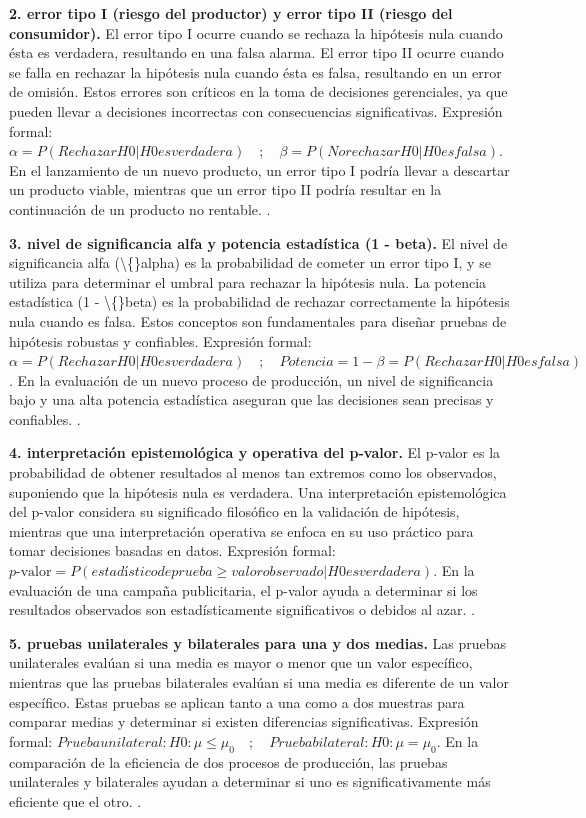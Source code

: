 {\textbf{2. error tipo I (riesgo del productor) y error tipo II (riesgo del consumidor).} El error tipo I ocurre cuando se rechaza la hipótesis nula cuando ésta es verdadera, resultando en una falsa alarma. El error tipo II ocurre cuando se falla en rechazar la hipótesis nula cuando ésta es falsa, resultando en un error de omisión. Estos errores son críticos en la toma de decisiones gerenciales, ya que pueden llevar a decisiones incorrectas con consecuencias significativas. Expresión formal: $\alpha = P(Rechazar H0 | H0 es verdadera)  \quad ; \quad \beta = P(No rechazar H0 | H0 es falsa)$. En el lanzamiento de un nuevo producto, un error tipo I podría llevar a descartar un producto viable, mientras que un error tipo II podría resultar en la continuación de un producto no rentable. \citep{anderson2012,lind2012,wackerly2010}.

\textbf{3. nivel de significancia alfa y potencia estadística (1 - beta).} El nivel de significancia alfa (\textbackslash\{\}alpha) es la probabilidad de cometer un error tipo I, y se utiliza para determinar el umbral para rechazar la hipótesis nula. La potencia estadística (1 - \textbackslash\{\}beta) es la probabilidad de rechazar correctamente la hipótesis nula cuando es falsa. Estos conceptos son fundamentales para diseñar pruebas de hipótesis robustas y confiables. Expresión formal: $\alpha = P(Rechazar H0 | H0 es verdadera)  \quad ; \quad Potencia = 1 - \beta = P(Rechazar H0 | H0 es falsa)$. En la evaluación de un nuevo proceso de producción, un nivel de significancia bajo y una alta potencia estadística aseguran que las decisiones sean precisas y confiables. \citep{anderson2012,lind2012,wackerly2010}.

\textbf{4. interpretación epistemológica y operativa del p-valor.} El p-valor es la probabilidad de obtener resultados al menos tan extremos como los observados, suponiendo que la hipótesis nula es verdadera. Una interpretación epistemológica del p-valor considera su significado filosófico en la validación de hipótesis, mientras que una interpretación operativa se enfoca en su uso práctico para tomar decisiones basadas en datos. Expresión formal: $p\text{-valor} = P(estadístico de prueba \geq valor observado | H0 es verdadera)$. En la evaluación de una campaña publicitaria, el p-valor ayuda a determinar si los resultados observados son estadísticamente significativos o debidos al azar. \citep{anderson2012,lind2012,wackerly2010}.

\textbf{5. pruebas unilaterales y bilaterales para una y dos medias.} Las pruebas unilaterales evalúan si una media es mayor o menor que un valor específico, mientras que las pruebas bilaterales evalúan si una media es diferente de un valor específico. Estas pruebas se aplican tanto a una como a dos muestras para comparar medias y determinar si existen diferencias significativas. Expresión formal: $Prueba unilateral: H0: \mu \leq \mu_0  \quad ; \quad Prueba bilateral: H0: \mu = \mu_0$. En la comparación de la eficiencia de dos procesos de producción, las pruebas unilaterales y bilaterales ayudan a determinar si uno es significativamente más eficiente que el otro. \citep{anderson2012,lind2012,wackerly2010}.

}
